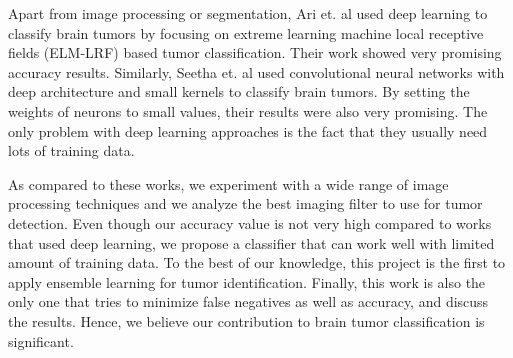 \documentclass[conference]{IEEEtran}
\begin{document}
Apart from image processing or segmentation, Ari et. al \cite{b5} used deep learning to classify brain tumors by focusing on extreme learning machine local receptive fields (ELM-LRF) based tumor classification. Their work showed very promising accuracy results. Similarly, Seetha et. al \cite{b6} used convolutional neural networks with deep architecture and small kernels to classify brain tumors. By setting the weights of neurons to small values, their results were also very promising. The only problem with deep learning approaches is the fact that they usually need lots of training data. 

As compared to these works, we experiment with a wide range of image processing techniques and we analyze the best imaging filter to use for tumor detection. Even though our accuracy value is not very high compared to works that used deep learning, we propose a classifier that can work well with limited amount of training data. To the best of our knowledge, this project is the first to apply ensemble learning for tumor identification. Finally, this work is also the only one that tries to minimize false negatives as well as accuracy, and discuss the results. Hence, we believe our contribution to brain tumor classification is significant.
\end{document}
